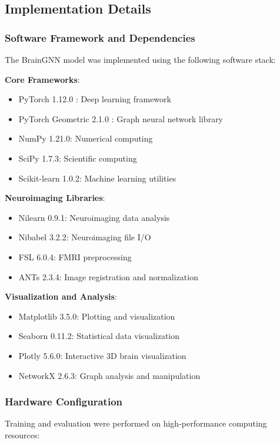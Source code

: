 \documentclass[10pt,journal,compsoc]{IEEEtran}
\begin{document}
\subsection{Implementation Details}

\subsubsection{Software Framework and Dependencies}

The BrainGNN model was implemented using the following software stack:

\textbf{Core Frameworks}:
\begin{itemize}
\item PyTorch 1.12.0 \cite{paszke2019pytorch}: Deep learning framework
\item PyTorch Geometric 2.1.0 \cite{fey2019fast}: Graph neural network library
\item NumPy 1.21.0: Numerical computing
\item SciPy 1.7.3: Scientific computing
\item Scikit-learn 1.0.2: Machine learning utilities
\end{itemize}

\textbf{Neuroimaging Libraries}:
\begin{itemize}
\item Nilearn 0.9.1: Neuroimaging data analysis
\item Nibabel 3.2.2: Neuroimaging file I/O
\item FSL 6.0.4: FMRI preprocessing
\item ANTs 2.3.4: Image registration and normalization
\end{itemize}

\textbf{Visualization and Analysis}:
\begin{itemize}
\item Matplotlib 3.5.0: Plotting and visualization
\item Seaborn 0.11.2: Statistical data visualization
\item Plotly 5.6.0: Interactive 3D brain visualization
\item NetworkX 2.6.3: Graph analysis and manipulation
\end{itemize}

\subsubsection{Hardware Configuration}

Training and evaluation were performed on high-performance computing resources:
\end{document}
